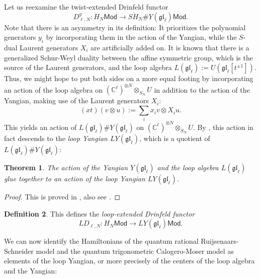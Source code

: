 \documentclass[11pt]{report}
\newtheorem{theorem}{Theorem}[section]
\theoremstyle{definition}
\newtheorem{definition}[theorem]{Definition}
\theoremstyle{remark}
\theoremstyle{remark}
\newcommand{\C}{\mathbb{C}}
\begin{document}
Let us reexamine the twist-extended Drinfeld functor
\begin{equation*}
D_{\ell,N}^g: \ddot H_N\mathsf{Mod} \to S\ddot H_N \# Y(\mathfrak{gl}_\ell) \mathsf{Mod}.
\end{equation*}
Note that there is an asymmetry in its definition: It prioritizes the polynomial generators $y_i$ by incorporating them in the action of the Yangian, while the $S$-dual Laurent generators $X_i$ are artificially added on. It is known that there is a generalized Schur-Weyl duality between the affine symmetric group, which is the source of the Laurent generators, and the loop algebra $L(\mathfrak{gl}_\ell) := U(\mathfrak{gl}_\ell[t^{\pm 1}])$. Thus, we might hope to put both sides on a more equal footing by incorporating an action of the loop algebra on $(\C^\ell)^{\otimes N} \otimes_{S_N} U$ in addition to the action of the Yangian, making use of the Laurent generators $X_i$:
\begin{equation*}
(x t)(v \otimes u) := \sum_i x_i v \otimes X_i u.
\end{equation*}
This yields an action of $L(\mathfrak{gl}_\ell) \# Y(\mathfrak{gl}_\ell)$ on $(\C^\ell)^{\otimes N} \otimes_{S_N} U$. By \cite{article:guay:2005}, this action in fact descends to the \emph{loop Yangian $LY(\mathfrak{gl}_\ell)$}, which is a quotient of $L(\mathfrak{gl}_\ell) \# Y(\mathfrak{gl}_\ell)$:

\begin{theorem}
The action of the Yangian $Y(\mathfrak{gl}_\ell)$ and the loop algebra $L(\mathfrak{gl}_\ell)$ glue together to an action of the loop Yangian $LY(\mathfrak{gl}_\ell)$.
\end{theorem}

\begin{proof}
This is proved in \cite{article:guay:2005}, also see \cite{article:kodera:2016}.
\end{proof}

\begin{definition}
This defines the \emph{loop-extended Drinfeld functor}
\begin{equation*}
LD_{\ell,N}: \ddot H_N\mathsf{Mod} \to LY(\mathfrak{gl}_\ell) \mathsf{Mod}.
\end{equation*}
\end{definition}

We can now identify the Hamiltonians of the quantum rational Ruijsenaars-Schneider model and the quantum trigonometric Calogero-Moser model as elements of the loop Yangian, or more precisely of the centers of the loop algebra and the Yangian:
\end{document}
